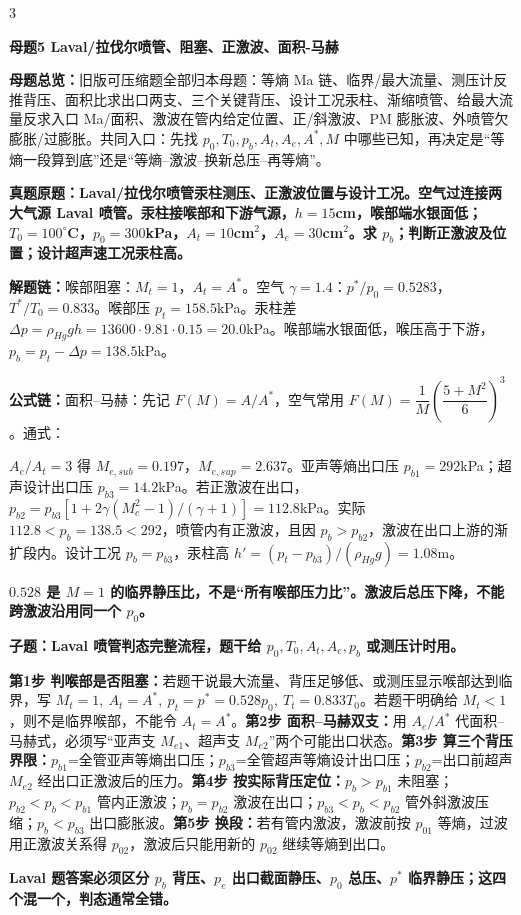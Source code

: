 \documentclass[a4paper]{article}
\newcommand{\mt}[1]{\vspace{0.22pt}\colorbox{M}{\parbox{\dimexpr\linewidth-2\fboxsep}{\color{white}\bfseries #1}}\par}
\newcommand{\qt}[1]{\vspace{0.10pt}\colorbox{Q}{\parbox{\dimexpr\linewidth-2\fboxsep}{\color{white}\bfseries #1}}\par}
\newcommand{\ans}[1]{\colorbox{G}{\parbox{\dimexpr\linewidth-2\fboxsep}{#1}}\par}
\newcommand{\warn}[1]{\colorbox{Y}{\parbox{\dimexpr\linewidth-2\fboxsep}{\color{E}\bfseries #1}}\par}
\newcommand{\chain}[1]{{\color{A}\bfseries 解题链：}#1\par}
\newcommand{\form}[1]{{\color{M}\bfseries 公式链：}#1\par}
\newcommand{\mview}[1]{\ans{\textbf{母题总览：}#1}}
\newenvironment{vfourWrap}{\par\begingroup\fontsize{2.66}{2.80}\selectfont\setlength{\fboxsep}{0.38pt}}{\par\endgroup}
\begin{document}
\begin{multicols}{3}
\begin{vfourWrap}
\end{vfourWrap}
\mt{母题5 Laval/拉伐尔喷管、阻塞、正激波、面积-马赫}
\mview{旧版可压缩题全部归本母题：等熵 Ma 链、临界/最大流量、测压计反推背压、面积比求出口两支、三个关键背压、设计工况汞柱、渐缩喷管、给最大流量反求入口 Ma/面积、激波在管内给定位置、正/斜激波、PM 膨胀波、外喷管欠膨胀/过膨胀。共同入口：先找 $p_0,T_0,p_b,A_t,A_e,A^*,M$ 中哪些已知，再决定是“等熵一段算到底”还是“等熵--激波--换新总压--再等熵”。}
\qt{真题原题：Laval/拉伐尔喷管汞柱测压、正激波位置与设计工况。空气过连接两大气源 Laval 喷管。汞柱接喉部和下游气源，$h=15$cm，喉部端水银面低；$T_0=100^\circ$C，$p_0=300$kPa，$A_t=10$cm$^2$，$A_e=30$cm$^2$。求 $p_b$；判断正激波及位置；设计超声速工况汞柱高。}
\chain{喉部阻塞：$M_t=1$，$A_t=A^*$。空气 $\gamma=1.4$：$p^*/p_0=0.5283$，$T^*/T_0=0.833$。喉部压 $p_t=158.5$kPa。汞柱差 $\Delta p=\rho_{Hg}gh=13600\cdot9.81\cdot0.15=20.0$kPa。喉部端水银面低，喉压高于下游，$p_b=p_t-\Delta p=138.5$kPa。}
\form{面积--马赫：先记 $F(M)=A/A^*$，空气常用 $F(M)=\dfrac1M\left(\dfrac{5+M^2}{6}\right)^3$。通式：}
\ans{\resizebox{0.94\linewidth}{!}{$\displaystyle F(M)=\frac{A}{A^*}=\frac1M\left[\frac{2}{\gamma+1}\left(1+\frac{\gamma-1}{2}M^2\right)\right]^{\frac{\gamma+1}{2(\gamma-1)}}$}}
\ans{$A_e/A_t=3$ 得 $M_{e,sub}=0.197$，$M_{e,sup}=2.637$。亚声等熵出口压 $p_{b1}=292$kPa；超声设计出口压 $p_{b3}=14.2$kPa。若正激波在出口，$p_{b2}=p_{b3}[1+2\gamma(M_e^2-1)/(\gamma+1)]=112.8$kPa。实际 $112.8<p_b=138.5<292$，喷管内有正激波，且因 $p_b>p_{b2}$，激波在出口上游的渐扩段内。设计工况 $p_b=p_{b3}$，汞柱高 $h'=(p_t-p_{b3})/(\rho_{Hg}g)=1.08$m。}
\warn{$0.528$ 是 $M=1$ 的临界静压比，不是“所有喉部压力比”。激波后总压下降，不能跨激波沿用同一个 $p_0$。}

\qt{子题：Laval 喷管判态完整流程，题干给 $p_0,T_0,A_t,A_e,p_b$ 或测压计时用。}
\ans{\textbf{第1步 判喉部是否阻塞：}若题干说最大流量、背压足够低、或测压显示喉部达到临界，写 $M_t=1,\ A_t=A^*,\ p_t=p^*=0.528p_0,\ T_t=0.833T_0$。若题干明确给 $M_t<1$，则不是临界喉部，不能令 $A_t=A^*$。\textbf{第2步 面积--马赫双支：}用 $A_e/A^*$ 代面积--马赫式，必须写“亚声支 $M_{e1}$、超声支 $M_{e2}$”两个可能出口状态。\textbf{第3步 算三个背压界限：}$p_{b1}$=全管亚声等熵出口压；$p_{b3}$=全管超声等熵设计出口压；$p_{b2}$=出口前超声 $M_{e2}$ 经出口正激波后的压力。\textbf{第4步 按实际背压定位：}$p_b>p_{b1}$ 未阻塞；$p_{b2}<p_b<p_{b1}$ 管内正激波；$p_b=p_{b2}$ 激波在出口；$p_{b3}<p_b<p_{b2}$ 管外斜激波压缩；$p_b<p_{b3}$ 出口膨胀波。\textbf{第5步 换段：}若有管内激波，激波前按 $p_{01}$ 等熵，过波用正激波关系得 $p_{02}$，激波后只能用新的 $p_{02}$ 继续等熵到出口。}
\warn{Laval 题答案必须区分 $p_b$ 背压、$p_e$ 出口截面静压、$p_0$ 总压、$p^*$ 临界静压；这四个混一个，判态通常全错。}


\end{multicols}
\end{document}
